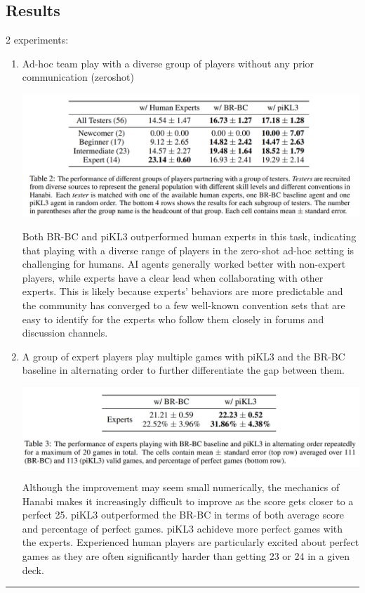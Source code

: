 \documentclass[12pt]{article}
\begin{document}
\subsection{Results}
2 experiments:
\begin{enumerate}
  \item Ad-hoc team play with a diverse group of players without any prior communication (zeroshot)
  \begin{center}
    \includegraphics*{table19.png}
  \end{center}
  Both BR-BC and piKL3 outperformed human experts in this task, indicating that playing with a diverse range of players in the zero-shot ad-hoc setting is challenging for humans. AI agents generally worked better with non-expert players, while experts have a clear lead when
  collaborating with other experts. This is likely because experts' behaviors are more predictable and
  the community has converged to a few well-known convention sets that are easy to identify for the
  experts who follow them closely in forums and discussion channels.
  \item  A group of expert players play multiple games with
  piKL3 and the BR-BC baseline in alternating order to further differentiate the gap between them.
  \begin{center}
    \includegraphics*[scale = 0.7]{table20.png}
  \end{center}
  Although the improvement
may seem small numerically, the mechanics of Hanabi makes it increasingly difficult to improve as
the score gets closer to a perfect 25. piKL3 outperformed the BR-BC in terms of both average score and percentage of perfect games. piKL3 achideve more perfect games with the experts. Experienced human players are particularly excited about perfect games as they are often
  significantly harder than getting 23 or 24 in a given deck.
\end{enumerate}
\hrule height 2pt \relax 
\end{document}
